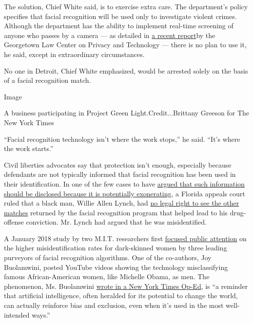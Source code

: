 The solution, Chief White said, is to exercise extra care. The
department's policy specifies that facial recognition will be used only
to investigate violent crimes. Although the department has the ability
to implement real-time screening of anyone who passes by a camera --- as
detailed in \href{https://www.americaunderwatch.com/}{a recent report}by
the Georgetown Law Center on Privacy and Technology --- there is no plan
to use it, he said, except in extraordinary circumstances.

No one in Detroit, Chief White emphasized, would be arrested solely on
the basis of a facial recognition match.

Image

A business participating in Project Green Light.Credit...Brittany
Greeson for The New York Times

``Facial recognition technology isn't where the work stops,'' he said.
``It's where the work starts.''

Civil liberties advocates say that protection isn't enough, especially
because defendants are not typically informed that facial recognition
has been used in their identification. In one of the few cases to have
\href{https://www.jacksonville.com/public-safety/2016-11-11/how-accused-drug-dealer-revealed-jso-s-facial-recognition-network}{argued
that such information should be disclosed because it is potentially
exonerating}, a Florida appeals court ruled that a black man, Willie
Allen Lynch, had
\href{https://www.jacksonville.com/news/20190123/florida-court-prosecutors-had-no-obligation-to-turn-over-facial-recognition-evidence}{no
legal right to see the other matches} returned by the facial recognition
program that helped lead to his drug-offense conviction. Mr. Lynch had
argued that he was misidentified.

A January 2018 study by two M.I.T. researchers first
\href{https://www.nytimes.com/2018/02/09/technology/facial-recognition-race-artificial-intelligence.html}{focused
public attention} on the higher misidentification rates for dark-skinned
women by three leading purveyors of facial recognition algorithms. One
of the co-authors, Joy Buolamwini, posted YouTube videos showing the
technology misclassifying famous African-American women, like Michelle
Obama, as men. The phenomenon, Ms. Buolamwini
\href{https://www.nytimes.com/2018/06/21/opinion/facial-analysis-technology-bias.html}{wrote
in a New York Times Op-Ed}, is ``a reminder that artificial
intelligence, often heralded for its potential to change the world, can
actually reinforce bias and exclusion, even when it's used in the most
well-intended ways.''

